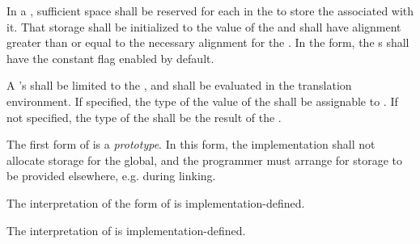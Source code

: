 \specsubsubitem
In a , sufficient space shall be reserved for
each  in the  to store
the  associated with it. That storage shall be initialized to
the value of the  and shall have alignment greater than
or equal to the necessary alignment for the . In the
 form, the s shall have the constant flag
enabled by default.

\specsubsubitem
A 's  shall be limited to
the , and shall be evaluated
in the translation environment. If specified, the type of the value of the
 shall be assignable to . If not
specified, the type of the  shall be the result
of the .

\specsubsubitem
The first form of  is a \textit{prototype}. In this
form, the implementation shall not allocate storage for the global, and the
programmer must arrange for storage to be provided elsewhere, e.g. during linking.

\specsubsubitem
The interpretation of the  form of  is
implementation-defined.


\specsubsubitem
The interpretation of  is implementation-defined.



\begin{grammar}
 \\
	  \\

 \\
	 \optional{\terminal{,}} \\
	 \terminal{,}  \\

 \\
	 \terminal{:}  \terminal{=}  \\
	 \terminal{=}  \\
\end{grammar}

